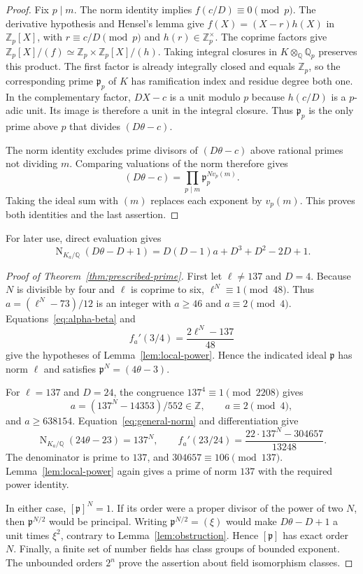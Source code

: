 \documentclass[11pt,leqno,oneside,letterpaper]{amsart}
\theoremstyle{remark}
\numberwithin{equation}{section}
\newcommand{\Q}{\mathbb Q}
\newcommand{\Z}{\mathbb Z}
\DeclareMathOperator{\Nm}{N}
\begin{document}
\begin{proof}
  Fix $p\mid m$. The norm identity implies $f(c/D)\equiv0\pmod p$. The derivative hypothesis and Hensel's lemma give $f(X)=(X-r)h(X)$ in $\Z_p[X]$, with $r\equiv c/D\pmod p$ and $h(r)\in\Z_p^\times$. The coprime factors give $\Z_p[X]/(f)\simeq\Z_p\times\Z_p[X]/(h)$. Taking integral closures in $K\otimes_{\Q}\Q_p$ preserves this product. The first factor is already integrally closed and equals $\Z_p$, so the corresponding prime $\mathfrak p_p$ of $K$ has ramification index and residue degree both one. In the complementary factor, $DX-c$ is a unit modulo $p$ because $h(c/D)$ is a $p$-adic unit. Its image is therefore a unit in the integral closure. Thus $\mathfrak p_p$ is the only prime above $p$ that divides $(D\theta-c)$.

  The norm identity excludes prime divisors of $(D\theta-c)$ above rational primes not dividing $m$. Comparing valuations of the norm therefore gives
  \[
    (D\theta-c)=\prod_{p\mid m}\mathfrak p_p^{Nv_p(m)}.
  \]
  Taking the ideal sum with $(m)$ replaces each exponent by $v_p(m)$. This proves both identities and the last assertion.
\end{proof}

For later use, direct evaluation gives
\begin{equation}\label{eq:general-norm}
  \Nm_{K_a/\Q}(D\theta-D+1)=D(D-1)a+D^3+D^2-2D+1.
\end{equation}

\begin{proof}[Proof of Theorem~\ref{thm:prescribed-prime}]
  First let $\ell\ne137$ and $D=4$. Because $N$ is divisible by four and $\ell$ is coprime to six, $\ell^N\equiv1\pmod{48}$. Thus $a=(\ell^N-73)/12$ is an integer with $a\geq46$ and $a\equiv2\pmod4$. Equations~\eqref{eq:alpha-beta} and
  \[
    f_a'(3/4)=\frac{2\ell^N-137}{48}
  \]
  give the hypotheses of Lemma~\ref{lem:local-power}. Hence the indicated ideal $\mathfrak p$ has norm $\ell$ and satisfies $\mathfrak p^N=(4\theta-3)$.

  For $\ell=137$ and $D=24$, the congruence $137^4\equiv1\pmod{2208}$ gives
  \[
    a=(137^N-14353)/552\in\Z,\qquad a\equiv2\pmod4,
  \]
  and $a\geq638154$. Equation~\eqref{eq:general-norm} and differentiation give
  \[
    \Nm_{K_a/\Q}(24\theta-23)=137^N,\qquad
    f_a'(23/24)=\frac{22\cdot137^N-304657}{13248}.
  \]
  The denominator is prime to $137$, and $304657\equiv106\pmod{137}$. Lemma~\ref{lem:local-power} again gives a prime of norm $137$ with the required power identity.

  In either case, $[\mathfrak p]^N=1$. If its order were a proper divisor of the power of two $N$, then $\mathfrak p^{N/2}$ would be principal. Writing $\mathfrak p^{N/2}=(\xi)$ would make $D\theta-D+1$ a unit times $\xi^2$, contrary to Lemma~\ref{lem:obstruction}. Hence $[\mathfrak p]$ has exact order $N$. Finally, a finite set of number fields has class groups of bounded exponent. The unbounded orders $2^n$ prove the assertion about field isomorphism classes.
\end{proof}
\end{document}

